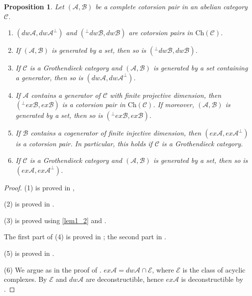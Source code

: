 \documentclass[11pt,a4paper,reqno]{amsart}
\newcommand{\A}{\mathcal{A}}
\newcommand{\B}{\mathcal{B}}
\newcommand{\C}{\mathcal{C}}
\newcommand{\E}{\mathcal{E}}
\newcommand{\Ch}{\mathrm{Ch}}
\theoremstyle{plain}
\newtheorem{prop}[thm]{Proposition}
\theoremstyle{definition}
\theoremstyle{remark}
\begin{document}
   \begin{prop}\label{P:complete?} Let $(\A, \B)$ be a complete cotorsion pair in an abelian category $\C$.
 \begin{enumerate}
  \item $(dw\A, dw\A^\perp)$ and $(^\perp dw\B, dw\B)$ are cotorsion pairs in $\Ch(\C)$.
  \item If $(\A, \B)$ is generated by a set, then so is $(^\perp dw\B, dw\B)$.
  \item If $\C$ is a Grothendieck category and $(\A, \B)$ is generated by a set containing a generator, then so is $(dw\A, dw\A^\perp)$.

  \item If $\A$ contains a generator of $\C$ with finite projective dimension,
  then $(^\perp ex\B, ex\B)$ is a cotorsion pair in $\Ch(\C)$. If moreover, $(\A, \B)$ is generated by a set, then so is $(^\perp ex\B, ex\B)$.
  \item If $\B$ contains a cogenerator of finite injective dimension, then $(ex\A, ex\A^\perp)$ is a cotorsion pair.
   In particular, this holds if $\C$ is a Grothendieck category.

   \item If $\C$ is a Grothendieck category and $(\A, \B)$ is generated by a set, then so is $(ex\A, ex\A^\perp)$.


   \end{enumerate}
  \end{prop}
 \begin{proof}
  (1) is proved in \cite[Proposition 3.2]{G4},

  (2) is proved in \cite[Proposition 4.4]{G4}.

  (3) is proved using \ref{lem1_2} and \cite[Theorem 4.2]{St10-deconstr}.

  The first part of (4) is proved in \cite[Proposition 3.3]{G4}; the second part in \cite[Proposition 4.6]{G4}.

  (5) is proved in \cite[Proposition 3.3]{G4}.

  (6) We argue as in the proof of \cite[Proposition 7.3]{G6}. $ex\A=dw\A\cap \E$, where $\E$ is the class of acyclic complexes. By \cite[Theorem 4.2]{St10-deconstr} $\E$ and $dw \A$ are deconstructible, hence $ex\A$ is deconstructible by \cite[Proposition 2.9]{St10-deconstr}.
  \end{proof}

%
%
%
%
%
%
%
%
%
%
%

%
%
%
%
%
\end{document}
